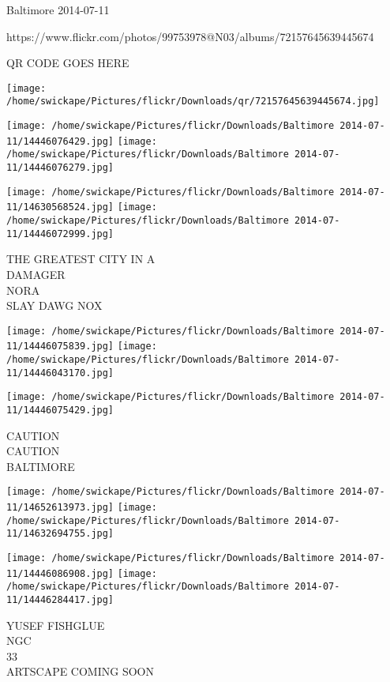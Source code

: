 \documentclass[10pt,letterpaper]{article}
\begin{document}
Baltimore 2014-07-11

https://www.flickr.com/photos/99753978@N03/albums/72157645639445674

QR CODE GOES HERE

\texttt{[image: /home/swickape/Pictures/flickr/Downloads/qr/72157645639445674.jpg]}
\pagebreak

\texttt{[image: /home/swickape/Pictures/flickr/Downloads/Baltimore 2014-07-11/14446076429.jpg]}
\texttt{[image: /home/swickape/Pictures/flickr/Downloads/Baltimore 2014-07-11/14446076279.jpg]}

\texttt{[image: /home/swickape/Pictures/flickr/Downloads/Baltimore 2014-07-11/14630568524.jpg]}
\texttt{[image: /home/swickape/Pictures/flickr/Downloads/Baltimore 2014-07-11/14446072999.jpg]}

THE GREATEST CITY IN A\\
DAMAGER\\
NORA\\
SLAY DAWG NOX\\
\pagebreak

\texttt{[image: /home/swickape/Pictures/flickr/Downloads/Baltimore 2014-07-11/14446075839.jpg]}
\texttt{[image: /home/swickape/Pictures/flickr/Downloads/Baltimore 2014-07-11/14446043170.jpg]}

\vspace{0.25in}
\texttt{[image: /home/swickape/Pictures/flickr/Downloads/Baltimore 2014-07-11/14446075429.jpg]}

CAUTION\\
CAUTION\\
BALTIMORE\\
\pagebreak

\texttt{[image: /home/swickape/Pictures/flickr/Downloads/Baltimore 2014-07-11/14652613973.jpg]}
\texttt{[image: /home/swickape/Pictures/flickr/Downloads/Baltimore 2014-07-11/14632694755.jpg]}

\texttt{[image: /home/swickape/Pictures/flickr/Downloads/Baltimore 2014-07-11/14446086908.jpg]}
\texttt{[image: /home/swickape/Pictures/flickr/Downloads/Baltimore 2014-07-11/14446284417.jpg]}

YUSEF FISHGLUE\\
NGC\\
33\\
ARTSCAPE COMING SOON\\
\pagebreak
\end{document}
